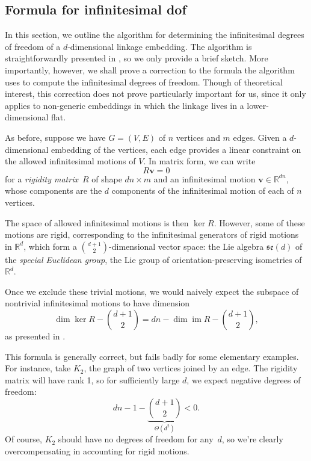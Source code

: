 \documentclass[aps,prd,final,twocolumn,letterpaper,nofootinbib]{revtex4-1}
\newcommand\RR{\mathbb{R}}
\DeclareMathOperator\im{im}
\newcommand{\mb}{\mathbf}
\begin{document}
\subsection{Formula for infinitesimal dof}


In this section,
we outline the algorithm for determining the infinitesimal degrees of freedom
of a $d$-dimensional linkage embedding.
The algorithm is straightforwardly presented in \cite[\S4.4.2]{gfalop},
so we only provide a brief sketch.
More importantly, however,
we shall prove a correction to the formula the algorithm uses
to compute the infinitesimal degrees of freedom.
Though of theoretical interest,
this correction does not prove particularly important for us,
since it only applies to non-generic embeddings
in which the linkage lives in a lower-dimensional flat.

As before, suppose we have $G = (V, E)$ of $n$ vertices and $m$ edges.
Given a $d$-dimensional embedding of the vertices,
each edge provides a linear constraint
on the allowed infinitesimal motions of $V$.
In matrix form, we can write
\begin{equation}
    R\mb v = 0
\end{equation}
for a \emph{rigidity matrix}~$R$ of shape $dn \times m$
and an infinitesimal motion $\mb v \in \RR^{dn}$,
whose components are the $d$ components
of the infinitesimal motion of each of $n$ vertices.

The space of allowed infinitesimal motions is then $\ker R$.
However, some of these motions are rigid,
corresponding to the infinitesimal generators of rigid motions in $\RR^d$,
which form a $\binom{d+1}{2}$-dimensional vector space:
the Lie algebra $\mathfrak{se}(d)$ of the \emph{special Euclidean group},
the Lie group of orientation-preserving isometries of $\RR^d$.

Once we exclude these trivial motions,
we would naively expect the subspace of nontrivial infinitesimal motions
to have dimension
\begin{equation}\label{eq:wrong-infdof}
    \dim\ker R - \binom{d+1}{2} = dn - \dim\im R - \binom{d+1}{2},
\end{equation}
as presented in \cite{gfalop}.

This formula is generally correct,
but fails badly for some elementary examples.
For instance, take $K_2$, the graph of two vertices joined by an edge.
The rigidity matrix will have rank 1,
so for sufficiently large $d$,
we expect negative degrees of freedom:
\[
    dn - 1 - \underbrace{\binom{d+1}{2}}_{\Theta(d^2)} < 0.
\]
Of course, $K_2$ should have no degrees of freedom for any~$d$,
so we're clearly overcompensating in accounting for rigid motions.
\end{document}
